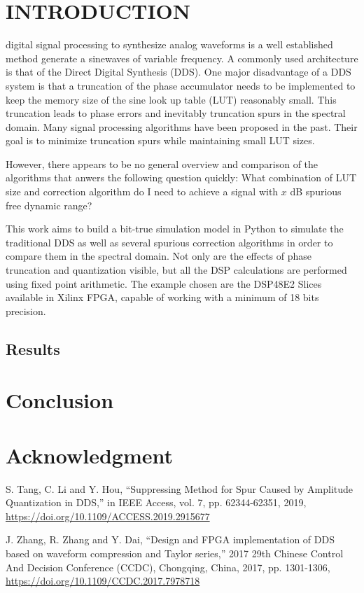 \documentclass[lettersize,journal]{IEEEtran}
\begin{document}
\section{INTRODUCTION}

 digital signal processing to synthesize analog waveforms is a well established method generate a sinewaves of variable frequency. A commonly used architecture is that of the Direct Digital Synthesis (DDS). One major disadvantage of a DDS system is that a truncation of the phase accumulator needs to be implemented to keep the memory size of the sine look up table (LUT) reasonably small. This truncation leads to phase errors and inevitably truncation spurs in the spectral domain. Many signal processing algorithms have been proposed in the past. Their goal is to minimize truncation spurs while maintaining small LUT sizes.

However, there appears to be no general overview and comparison of the algorithms that anwers the following question quickly:
What combination of LUT size and correction algorithm do I need to achieve a signal with $x$ dB spurious free dynamic range?

This work aims to build a bit-true simulation model in Python to simulate the traditional DDS as well as several spurious correction algorithms in order to compare them in the spectral domain. Not only are the effects of phase truncation and quantization visible, but all the DSP calculations are performed using fixed point arithmetic. The example chosen are the DSP48E2 Slices available in Xilinx FPGA, capable of working with a minimum of 18 bits precision.





\subsection{Results}


\section{Conclusion}


\section*{Acknowledgment}


\begin{thebibliography}{00}
	 S. Tang, C. Li and Y. Hou, ``Suppressing Method for Spur Caused by Amplitude Quantization in DDS,'' in IEEE Access, vol. 7, pp. 62344-62351, 2019, \url{https://doi.org/10.1109/ACCESS.2019.2915677}
	
	 J. Zhang, R. Zhang and Y. Dai, ``Design and FPGA implementation of DDS based on waveform compression and Taylor series,'' 2017 29th Chinese Control And Decision Conference (CCDC), Chongqing, China, 2017, pp. 1301-1306, \url{https://doi.org/10.1109/CCDC.2017.7978718}


\end{thebibliography}
\end{document}
